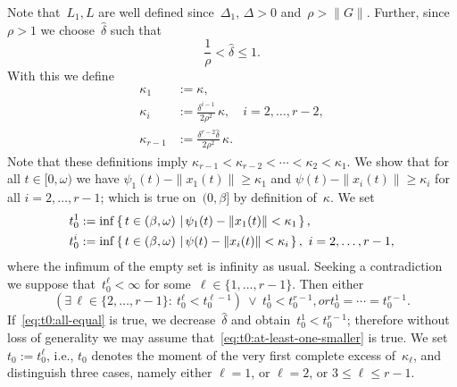 \documentclass[ envcountsect, envcountsame]{svjour3}
\newcommand{\setdef}[2]{\left\{\, #1\, \left|\, \vphantom{#1} #2 \right.\right\}}
\def\red#1{\textcolor[rgb]{0.60,0.10,0.07}{#1}}
\begin{document}
%
Note that~$L_1, L$ are well defined since~$\Delta_1, \, \Delta > 0$ and~$\rho > \|G\|$.
%
Further, since~$\rho > 1$ we choose~$\hat \delta $ such that
\begin{equation} \label{def:hatdelta}
\frac{1}{\rho} < \hat \delta \le 1 .
\end{equation}
%
With this we define
\begin{equation} \label{eq:kappas}
\begin{aligned}
\kappa_1 & := \kappa, \\
\kappa_i & :=  \frac{\delta^{i-1}}{2\rho^2} \, \kappa, \quad i=2,\ldots,r-2, \\
\kappa_{r-1} & := \frac{ \delta^{r-2} \hat \delta}{2\rho^2} \, \kappa.
\end{aligned}
\end{equation}
%
Note that these definitions imply $\kappa_{r-1} < \kappa_{r-2} < \cdots < \kappa_2 < \kappa_1$.
%
We show that for all $t \in [0,\omega)$ we have $\psi_1(t) - \|x_1(t)\| \ge \kappa_1$ 
and $\psi(t) - \|x_i(t)\| \ge \kappa_i$ for all $i=2,\ldots,r-1$;
which is true on~$(0,\beta]$ by definition of~$\kappa$. 
%
%
We set 
\begin{equation*}
\begin{aligned}
t_0^1 &:= \inf \setdef{t \in (\beta, \omega)}{ \psi_1(t) - \|x_1(t)\| < \kappa_1}, \\
t_0^i &:= \inf \setdef{t \in (\beta, \omega)}{ \psi(t) - \|x_i(t)\| < \kappa_i}, \  i = 2,\ldots,r-1,
\end{aligned}
\end{equation*}
where the infimum of the empty set is infinity as usual.
Seeking a contradiction we suppose that~$t_0^\ell < \infty$ for some~$\ell \in \{1,\ldots,r-1\}$.
%
%
Then either
\begin{subequations}
\begin{equation} \label{eq:t0:at-least-one-smaller}
\left( \exists\, \ell \in \{2,\ldots,r-1\} :  \ t_0^\ell < t_0^{\ell-1} \right) \ \lor \ t_0^1 < t_0^{r-1},
\end{equation}
or
\begin{equation} \label{eq:t0:all-equal}
t_0^1 = \cdots = t_0^{r-1}.
\end{equation}
\end{subequations}
%
If~\eqref{eq:t0:all-equal} is true, we decrease~$\hat \delta$ and obtain~$t_0^1 < t_0^{r-1}$; 
therefore without loss of generality we may assume that~\eqref{eq:t0:at-least-one-smaller} is true.
We set~$t_0 := t_0^\ell$, i.e., $t_0$ denotes the moment of the very first complete excess of~$\kappa_\ell$, and distinguish three cases, namely either $\ell = 1$, or $\ell=2$, or $3 \le \ell \le r-1$.
%
\end{document}

